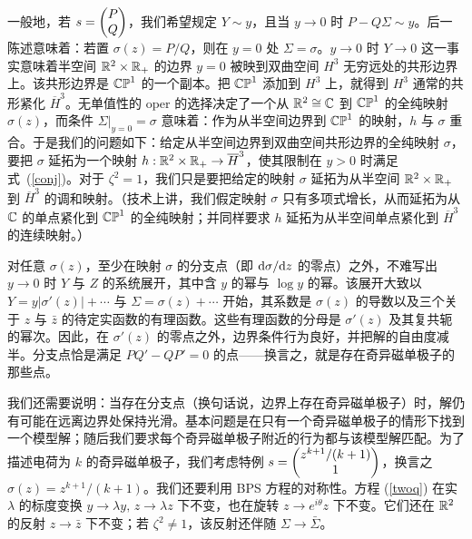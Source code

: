 一般地，若 $s = \begin{pmatrix}P\cr Q\end{pmatrix}$，我们希望规定 $Y\sim y$，且当 $y \to 0$ 时 $P - Q \Sigma \sim y$。后一陈述意味着：若置 $\sigma(z)=P/Q$，则在 $y=0$ 处 $\Sigma=\sigma$。$y\to 0$ 时 $Y\to 0$ 这一事实意味着半空间 ${\mathbb R}^2\times {\mathbb R}_+$ 的边界 $y=0$ 被映到双曲空间 $H^3$ 无穷远处的共形边界上。该共形边界是 ${\mathbb{CP}}^1$ 的一个副本。把 ${\mathbb{CP}}^1$ 添加到 $H^3$ 上，就得到 $H^3$ 通常的共形紧化 $\overline H^3$。无单值性的 oper 的选择决定了一个从 ${\mathbb R}^2\cong{\mathbb C}$ 到 ${\mathbb{CP}}^1$ 的全纯映射 $\sigma(z)$，而条件 $\Sigma|_{y=0}=\sigma$ 意味着：作为从半空间边界到 ${\mathbb{CP}}^1$ 的映射，$h$ 与 $\sigma$ 重合。于是我们的问题如下：给定从半空间边界到双曲空间共形边界的全纯映射 $\sigma$，要把 $\sigma$ 延拓为一个映射 $h:{\mathbb R}^2\times {\mathbb R}_+\to \overline H^3$，使其限制在 $y>0$ 时满足式~(\ref{conj})。对于 $\zeta^2=1$，我们只是要把给定的映射 $\sigma$ 延拓为从半空间 ${\mathbb R}^2\times {\mathbb R}_+$ 到 $\overline H^3$ 的调和映射。（技术上讲，我们假定映射 $\sigma$ 只有多项式增长，从而延拓为从 ${\mathbb C}$ 的单点紧化到 ${\mathbb{CP}}^1$ 的全纯映射；并同样要求 $h$ 延拓为从半空间单点紧化到 $\overline H^3$ 的连续映射。）

对任意 $\sigma(z)$，至少在映射 $\sigma$ 的分支点（即 ${\mathrm d}\sigma/{\mathrm d} z$ 的零点）之外，不难写出 $y \to 0$ 时 $Y$ 与 $Z$ 的系统展开，其中含 $y$ 的幂与 $\log y$ 的幂。该展开大致以 $Y =  y |\sigma'(z)| + \cdots$ 与 $\Sigma = \sigma(z) + \cdots$ 开始，其系数是 $\sigma(z)$ 的导数以及三个关于 $z$ 与 $\bar z$ 的待定实函数的有理函数。这些有理函数的分母是 $\sigma'(z)$ 及其复共轭的幂次。因此，在 $\sigma'(z)$ 的零点之外，边界条件行为良好，并把解的自由度减半。分支点恰是满足 $PQ'-QP'=0$ 的点——换言之，就是存在奇异磁单极子的那些点。


我们还需要说明：当存在分支点（换句话说，边界上存在奇异磁单极子）时，解仍有可能在远离边界处保持光滑。基本问题是在只有一个奇异磁单极子的情形下找到一个模型解；随后我们要求每个奇异磁单极子附近的行为都与该模型解匹配。为了描述电荷为 $k$ 的奇异磁单极子，我们考虑特例 $s = \begin{pmatrix}z^{k+1}/(k+1)\cr 1\end{pmatrix}$，换言之 $\sigma(z)=z^{k+1}/(k+1)$。我们还要利用 BPS 方程的对称性。方程 (\ref{twoq}) 在实 $\lambda$ 的标度变换 $y\to \lambda y, \,z\to \lambda z$ 下不变，也在旋转 $z\to e^{i\theta }z$ 下不变。它们还在 ${\mathbb R}^2$ 的反射 $z\to \bar z$ 下不变；若 $\zeta^2\not=1$，该反射还伴随 $\Sigma \to \bar \Sigma$。

